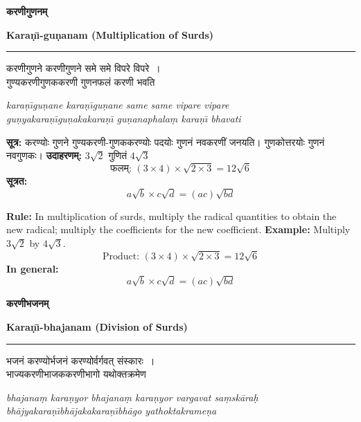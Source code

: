 \documentclass[11pt,a4paper]{article}
\newcommand{\dev}[1]{{\devanagarifont #1}}
\newcommand{\bicol}[2]{%
\noindent%
\begin{minipage}[t]{0.48\textwidth}
\begin{flushleft}
\small
#1
\end{flushleft}
\end{minipage}%
\hfill%
\begin{minipage}[t]{0.48\textwidth}
\begin{flushleft}
\small
#2
\end{flushleft}
\end{minipage}%
\vspace{0.4em}
}
\newcommand{\bicolverse}[2]{%
\par\noindent%
\begin{minipage}[t]{0.48\textwidth}
\centering
\color{versecolor}
\devanagarifont
\small
#1
\end{minipage}%
\hfill%
\begin{minipage}[t]{0.48\textwidth}
\centering
\color{versecolor}
\small
#2
\end{minipage}%
\par\vspace{0.4em}
}
\newcommand{\sectionbicol}[2]{%
\vspace{0.5em}
\noindent%
\begin{minipage}[t]{0.48\textwidth}
\begin{center}
\large\bfseries\color{sectioncolor}
\dev{#1}
\end{center}
\end{minipage}%
\hfill%
\begin{minipage}[t]{0.48\textwidth}
\begin{center}
\large\bfseries\color{sectioncolor}
#2
\end{center}
\end{minipage}%
\vspace{0.3em}
\noindent\rule{\textwidth}{0.4pt}
}
\begin{document}
\clearpage

\sectionbicol{करणीगुणनम्}{Kara\d{n}\={\i}-gu\d{n}anam (Multiplication of Surds)}

\vspace{0.3cm}

\bicolverse{%
करणीगुणने करणीगुणने समे समे विपरे विपरे~।\\
गुण्यकरणीगुणककरणी गुणनफलं करणी भवति~
}{%
\textit{kara\d{n}\={\i}gu\d{n}ane kara\d{n}\={\i}gu\d{n}ane same same vipare vipare}\\
\textit{gu\d{n}yakara\d{n}\={\i}gu\d{n}akakara\d{n}\={\i} gu\d{n}anaphala\d{m} kara\d{n}\={\i} bhavati}
}

\vspace{0.5cm}

\bicol{%
\textbf{सूत्र:} करण्योः गुणने गुण्यकरणी-गुणककरण्योः पदयोः गुणनं नवकरणीं जनयति। गुणकोत्तरयोः गुणनं नवगुणकः।
\vspace{0.3cm}
\textbf{उदाहरणम्:} $3\sqrt{2}$ गुणितं $4\sqrt{3}$
\[\text{फलम्: } (3 \times 4) \times \sqrt{2 \times 3} = 12\sqrt{6}\]
\textbf{सूत्रत:}
\[a\sqrt{b} \times c\sqrt{d} = (ac)\sqrt{bd}\]
}{%
\textbf{Rule:} In multiplication of surds, multiply the radical quantities to obtain the new radical; multiply the coefficients for the new coefficient.
\vspace{0.3cm}
\textbf{Example:} Multiply $3\sqrt{2}$ by $4\sqrt{3}$.
\[\text{Product: } (3 \times 4) \times \sqrt{2 \times 3} = 12\sqrt{6}\]
\textbf{In general:}
\[a\sqrt{b} \times c\sqrt{d} = (ac)\sqrt{bd}\]
}

\clearpage

\sectionbicol{करणीभजनम्}{Kara\d{n}\={\i}-bhajanam (Division of Surds)}

\vspace{0.3cm}

\bicolverse{%
भजनं करण्योर्भजनं करण्योर्वर्गवत् संस्कारः~।\\
भाज्यकरणीभाजककरणीभागो यथोक्तक्रमेण~
}{%
\textit{bhajana\d{m} kara\d{n}yor bhajana\d{m} kara\d{n}yor vargavat sa\d{msk\={a}ra\d{h}}}\\
\textit{bh\={a}jyakara\d{n}\={\i}bh\={a}jakakara\d{n}\={\i}bh\={a}go yathoktakrame\d{n}a}
}
\end{document}
